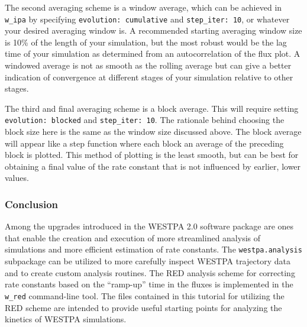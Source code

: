 The second averaging scheme is a window average, which can be achieved in \verb|w_ipa| by specifying \verb|evolution: cumulative| and \verb|step_iter: 10|, or whatever your desired averaging window is.
A recommended starting averaging window size is 10\% of the length of your simulation, but the most robust would be the lag time of your simulation as determined from an autocorrelation of the flux plot.
A windowed average is not as smooth as the rolling average but can give a better indication of convergence at different stages of your simulation relative to other stages.

The third and final averaging scheme is a block average.
This will require setting \verb|evolution: blocked| and \verb|step_iter: 10|.
The rationale behind choosing the block size here is the same as the window size discussed above.
The block average will appear like a step function where each block an average of the preceding block is plotted.
This method of plotting is the least smooth, but can be best for obtaining a final value of the rate constant that is not influenced by earlier, lower values.
\vspace{-0.3cm}

\subsubsection{Conclusion}

Among the upgrades introduced in the WESTPA 2.0 software package are ones that enable the creation and execution of more streamlined analysis of simulations and more efficient estimation of rate constants.
The \verb|westpa.analysis| subpackage can be utilized to more carefully inspect WESTPA trajectory data and to create custom analysis routines.
The RED analysis scheme for correcting rate constants based on the “ramp-up” time in the fluxes is implemented in the \verb|w_red| command-line tool.
The files contained in this tutorial for utilizing the RED scheme are intended to provide useful starting points for analyzing the kinetics of WESTPA simulations.
\pagebreak